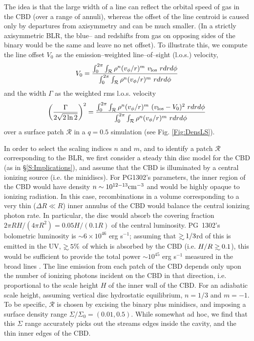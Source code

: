The idea is that the large width of a line can reflect the orbital
speed of gas in the CBD (over a range of annuli), whereas the offset
of the line centroid is caused only by departures from axisymmetry and
can be much smaller. (In a strictly axisymmetric BLR, the blue-- and
redshifts from gas on opposing sides of the binary would be the same and
leave no net offset).  To illustrate this, we compute the line offset $V_0$ as the emission--weighted line--of--sight (l.o.s.) velocity,
%
\begin{equation}
V_0= \frac{ \int^{2 \pi}_0 \int_{\mathcal{R}}{\rho^{n}(v_{\phi}/r)^{m}  \ v_{\rm{los}} \ r dr d\phi}  }{ \int^{2 \pi}_0 \int_{\mathcal{R}}\rho^{n}(v_{\phi}/r)^{m} \ r dr d\phi}
\label{Eq:cent}
\end{equation}
and the width $\Gamma$ as the weighted rms l.o.s. velocity
\begin{equation}
\left(\frac{\Gamma}{ 2 \sqrt{2 \ln{2}}}\right)^2 =\frac{  \int^{2 \pi}_0 \int_{\mathcal{R}}{\rho^{n}(v_{\phi}/r)^{m} \  (v_{\rm{los}} - V_0)^2 \ r dr d\phi}  }{ \int^{2 \pi}_0 \int_{\mathcal{R}} \rho^{n}(v_{\phi}/r)^{m}  \ r dr d\phi}
\label{Eq:FWHM}
\end{equation}
%
over a surface patch $\mathcal{R}$ in a $q=0.5$ simulation (see
Fig. \ref{Fig:DensLS}).  


In order to select the scaling indices $n$ and $m$, and to identify a
patch $\mathcal{R}$ corresponding to the BLR, we first consider a
steady thin disc model for the CBD (as in \S \ref{S:Implications}),
and assume that the CBD is illuminated by a central ionizing source
(i.e. the minidiscs).  For PG1302's parameters, the
inner region of the CBD would have density $n\sim 10^{12-13}{\rm
  cm^{-3}}$ and would be highly opaque to ionizing radiation.  In this
case, recombinations in a volume corresponding to a very thin ($\Delta
R \ll R$) inner annulus of the CBD would balance the central ionizing
photon rate.
In particular, the disc would absorb the covering fraction $2 \pi R
H/(4 \pi R^2) = 0.05 H/(0.1R)$ of the central luminosity.  PG~1302's
bolometric luminosity is $\sim 6 \times 10^{46}$ erg s$^{-1}$;
assuming that $\gsim 1/3$rd of this is emitted in the UV, $\gsim 5\%$
of which is absorbed by the CBD (i.e. $H/R\gsim 0.1$), this would be
sufficient to provide the total power $\sim 10^{45}$ erg s$^{-1}$
measured in the broad lines \citep{WangHo:2003}.  The line emission
from each patch of the CBD depends only upon the number of ionizing
photons incident on the CBD in that direction, i.e. proportional to
the scale height $H$ of the inner wall of the CBD. For an adiabatic
scale height, assuming vertical disc hydrostatic equilibrium, $n=1/3$
and $m=-1$. To be specific, $\mathcal{R}$ is chosen by excising the
binary plus minidiscs, and imposing a surface density range
$\Sigma/\Sigma_0 = (0.01, 0.5)$. While somewhat ad hoc, we find that
this $\Sigma$ range accurately picks out the streams edges inside the
cavity, and the thin inner edges of the CBD.

